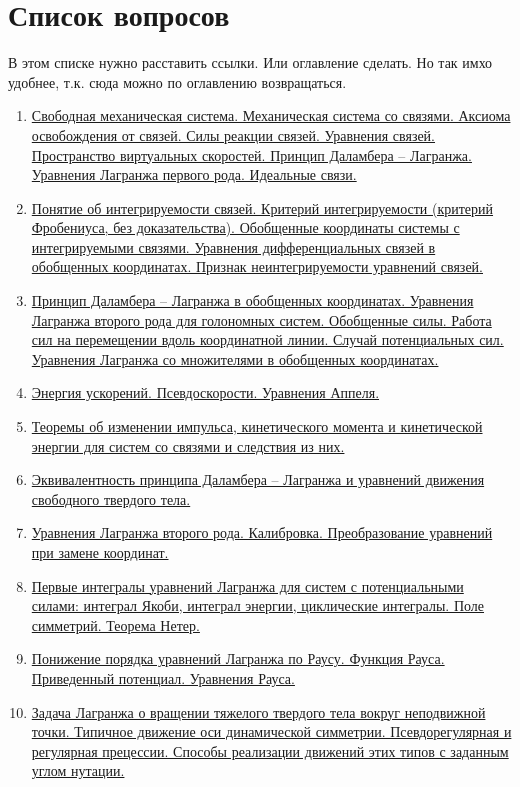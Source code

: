 \documentclass[specialist, subf, href, colorlinks=true, 12pt, times, mtpro, final]{disser}
\theoremstyle{definition}
\def\note{\textcolor{faded}}
\begin{document}
    
    \tableofcontents

    \section*{Список вопросов}
    \note{В этом списке нужно расставить ссылки. Или оглавление сделать. Но так имхо удобнее, т.к. сюда можно по оглавлению возвращаться.}
    \begin{enumerate}
    \item \hyperref[1]{Свободная механическая система. Механическая система со связями. Аксиома освобождения от связей. Силы реакции связей. Уравнения связей. Пространство виртуальных скоростей. Принцип Даламбера – Лагранжа. Уравнения Лагранжа первого рода. Идеальные связи.}
    \item \hyperref[2]{Понятие об интегрируемости связей. Критерий интегрируемости (критерий Фробениуса, без доказательства). Обобщенные координаты системы с интегрируемыми связями. Уравнения дифференциальных связей в обобщенных координатах. Признак неинтегрируемости уравнений связей.}
    \item \hyperref[3]{Принцип Даламбера – Лагранжа в обобщенных координатах. Уравнения Лагранжа второго рода для голономных систем. Обобщенные силы. Работа сил на перемещении вдоль координатной линии. Случай потенциальных сил. Уравнения Лагранжа со множителями в обобщенных координатах.}
    \item \hyperref[4]{Энергия ускорений. Псевдоскорости. Уравнения Аппеля.}
    \item \hyperref[5]{Теоремы об изменении импульса, кинетического момента и кинетической энергии для систем со связями и следствия из них.}
    \item \hyperref[6]{Эквивалентность принципа Даламбера – Лагранжа и уравнений движения свободного твердого тела.}
    \item \hyperref[7]{Уравнения Лагранжа второго рода. Калибровка. Преобразование уравнений при замене координат.}
    \item \hyperref[8]{Первые интегралы уравнений Лагранжа для систем с потенциальными силами:
    интеграл Якоби, интеграл энергии, циклические интегралы. Поле симметрий. Теорема Нетер.}
    \item \hyperref[9]{Понижение порядка уравнений Лагранжа по Раусу. Функция Рауса. Приведенный потенциал. Уравнения Рауса.}
    \item \hyperref[10]{Задача Лагранжа о вращении тяжелого твердого тела вокруг неподвижной точки. Типичное движение оси динамической симметрии. Псевдорегулярная и регулярная прецессии. Способы реализации движений этих типов с заданным углом нутации.}

\end{enumerate}
\end{document}
